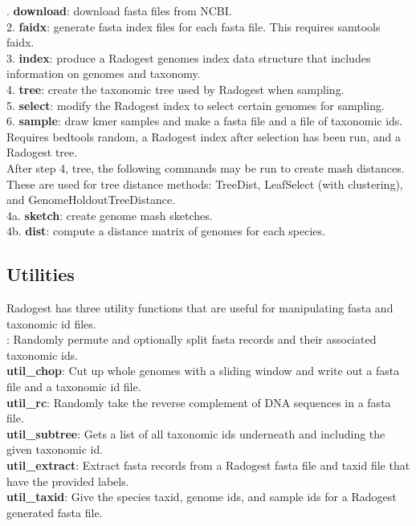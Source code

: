 \documentclass[12pt, letterpaper]{article}
\begin{document}
. \textbf{download}: download fasta files from NCBI. \\
2. \textbf{faidx}: generate fasta index files for each fasta file.  This requires samtools faidx.\\
3. \textbf{index}: produce a Radogest genomes index data structure that includes information on genomes and taxonomy.\\
4. \textbf{tree}: create the taxonomic tree used by Radogest when sampling.\\
5. \textbf{select}: modify the Radogest index to select certain genomes for sampling.\\
6. \textbf{sample}: draw kmer samples and make a fasta file and a file of taxonomic ids.  Requires bedtools random, a Radogest index after selection has been run, and a Radogest tree.\\

After step 4, tree, the following commands may be run to create mash distances.  These are used for tree distance methods: TreeDist, LeafSelect (with clustering), and GenomeHoldoutTreeDistance.\\

\noindent
4a. \textbf{sketch}: create genome mash sketches.\\
4b. \textbf{dist}: compute a distance matrix of genomes for each species.\\

\subsection{Utilities}
Radogest has three utility functions that are useful for manipulating fasta and taxonomic id files.\\

\noindent
\textbf{}: Randomly permute and optionally split fasta records and their associated taxonomic ids.\\
\textbf{util\_chop}: Cut up whole genomes with a sliding window and write out a fasta file and a taxonomic id file.\\
\textbf{util\_rc}: Randomly take the reverse complement of DNA sequences in a fasta file.\\
\textbf{util\_subtree}: Gets a list of all taxonomic ids underneath and including the given taxonomic id.\\
\textbf{util\_extract}: Extract fasta records from a Radogest fasta file and taxid file that have the provided labels.\\
\textbf{util\_taxid}: Give the species taxid, genome ids, and sample ids for a Radogest generated fasta file.\\
\end{document}
